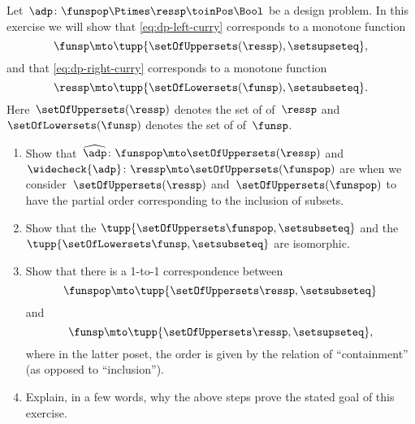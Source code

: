 \begin{gradedexercise}
    \label{ex:CurryingDesignProblems}
    Let~$\adp\colon \funspop \Ptimes \ressp\toinPos \Bool$ be a design problem.
    In this exercise we will show that \cref{eq:dp-left-curry} corresponds to a monotone function
    \begin{equation}
        \funsp \mto \tupp{\setOfUppersets (\ressp), {{\setsupseteq}}},
    \end{equation}
    and that \cref{eq:dp-right-curry} corresponds to a monotone function
    \begin{equation}
        \ressp \mto \tupp{\setOfLowersets(\funsp), {{\setsubseteq}}}.
    \end{equation}
    Here~$\setOfUppersets (\ressp)$ denotes the set of  of~$\ressp$ and~$\setOfLowersets(\funsp)$ denotes the set of  of~$\funsp$.

    \begin{enumerate}
        \item Show that~$\widehat{\adp} \colon \funspop \mto \setOfUppersets (\ressp)$ and~$\widecheck{\adp} \colon \ressp \mto \setOfUppersets (\funspop)$ are  when we consider~$\setOfUppersets (\ressp)$ and~$\setOfUppersets (\funspop)$ to have the partial order corresponding to the inclusion of subsets.
        \item Show that the  $\tupp{\setOfUppersets\funspop,{{\setsubseteq}}}$ and the  $\tupp{\setOfLowersets\funsp, {{\setsubseteq}}}$ are isomorphic.
        \item Show that there is a 1-to-1 correspondence between   \begin{equation}
                  \funspop \mto \tupp{\setOfUppersets \ressp, {{\setsubseteq}}}
              \end{equation}
              and   \begin{equation}
                  \funsp \mto \tupp{\setOfUppersets \ressp, {{\setsupseteq}}},
              \end{equation}
              where in the latter poset, the order is given by the relation of ``containment'' (as opposed to ``inclusion'').
        \item Explain, in a few words, why the above steps prove the stated goal of this exercise.
    \end{enumerate}
\end{gradedexercise}

